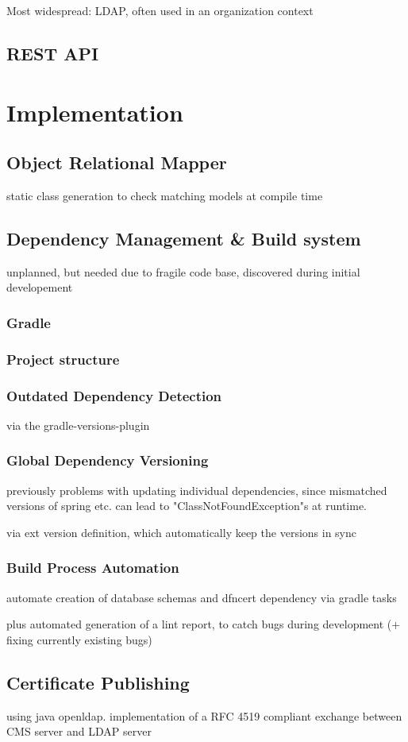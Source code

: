 Most widespread: LDAP, often used in an organization context

\section{REST API}

\chapter{Implementation}

\section{Object Relational Mapper}
static class generation to check matching models at compile time

\section{Dependency Management \& Build system}
unplanned, but needed due to fragile code base, discovered during initial developement
\subsection{Gradle}
\subsection{Project structure}
\subsection{Outdated Dependency Detection} %
via the gradle-versions-plugin
\subsection{Global Dependency Versioning}
previously problems with updating individual dependencies, since mismatched versions of spring etc. can lead to
"ClassNotFoundException"s at runtime.

via ext version definition, which automatically keep the versions in sync
\subsection{Build Process Automation}
automate creation of database schemas and dfncert dependency via gradle tasks

plus automated generation of a lint report, to catch bugs during development (+ fixing currently existing bugs)

\section{Certificate Publishing}
using java openldap. implementation of a RFC 4519 compliant exchange between CMS server and LDAP server

\subsection{}

